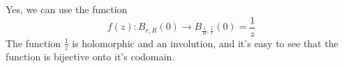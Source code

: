 \documentclass{homework}
\begin{document}
                                                                                                                                                        \begin{solution}
                                                                                                                                                        Yes, we can use the function
                                                                                                                                                        \[
                                                                                                                                                        f(z): B_{r, R}(0) \to B_{\frac{1}{R}, \frac{1}{r}}(0) = \frac{1}{z}
                                                                                                                                                        \]
                                                                                                                                                        The function $\frac{1}{z}$ is holomorphic and an involution, and it's easy to see that the function is bijective onto it's codomain.
                                                                                                                                                        \end{solution}
\end{document}

